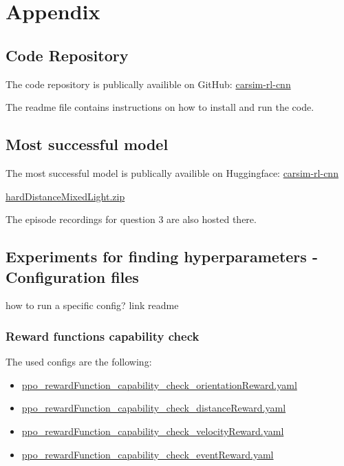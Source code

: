 \chapter{Appendix}
\label{cha:Appendix}

\section{Code Repository}

The code repository is publically availible on GitHub:
\href{https://github.com/geschnee/carsim-rl-cnn}{carsim-rl-cnn}

The readme file contains instructions on how to install and run the code.

\section{Most successful model}

The most successful model is publically availible on Huggingface:
\href{https://huggingface.co/geschnee/carsim-rl-cnn}{carsim-rl-cnn}

\href{https://huggingface.co/geschnee/carsim-rl-cnn/blob/main/models/hardDistanceMixedLight.zip}{hardDistanceMixedLight.zip}

The episode recordings for question 3 are also hosted there.


\section{Experiments for finding hyperparameters - Configuration files}
\label{cha:experiment_configs}

how to run a specific config? link readme

\subsection{Reward functions capability check}
The used configs are the following:
\begin{itemize}
    \item \href{https://github.com/geschnee/carsim-rl-cnn/tree/main/python/cfg/ppo_rewardFunction_capability_check_orientationReward.yaml}{ppo\_rewardFunction\_capability\_check\_orientationReward.yaml}
    \item \href{https://github.com/geschnee/carsim-rl-cnn/tree/main/python/cfg/ppo_rewardFunction_capability_check_distanceReward.yaml}{ppo\_rewardFunction\_capability\_check\_distanceReward.yaml}
    \item \href{https://github.com/geschnee/carsim-rl-cnn/tree/main/python/cfg/ppo_rewardFunction_capability_check_velocityReward.yaml}{ppo\_rewardFunction\_capability\_check\_velocityReward.yaml}
    \item \href{https://github.com/geschnee/carsim-rl-cnn/tree/main/python/cfg/ppo_rewardFunction_capability_check_eventReward.yaml}{ppo\_rewardFunction\_capability\_check\_eventReward.yaml}
\end{itemize}


